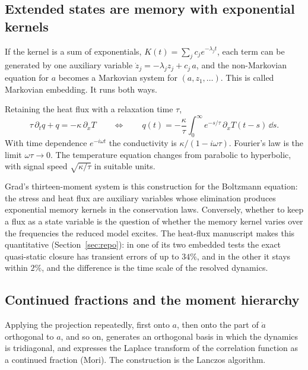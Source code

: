 \subsection{Extended states are memory with exponential kernels}
\label{sec:embedding}

If the kernel is a sum of exponentials, $K(t)=\sum_jc_je^{-\lambda_jt}$,
each term can be generated by one auxiliary variable
$\dot z_j=-\lambda_jz_j+c_j\,a$, and the non-Markovian equation for $a$
becomes a Markovian system for $(a,z_1,\dots)$. This is called Markovian
embedding. It runs both ways.

\begin{example}
\label{ex:cattaneo}
Retaining the heat flux with a relaxation time $\tau$,
\begin{equation}
  \tau\,\partial_tq+q=-\kappa\,\partial_xT
  \qquad\Longleftrightarrow\qquad
  q(t)=-\frac{\kappa}{\tau}\int_0^\infty e^{-s/\tau}\,\partial_xT(t-s)\,\dd s .
\end{equation}
With time dependence $e^{-i\omega t}$ the conductivity is
$\kappa/(1-i\omega\tau)$. Fourier's law is the limit $\omega\tau\to0$. The
temperature equation changes from parabolic to hyperbolic, with signal
speed $\sqrt{\kappa/\tau}$ in suitable units.
\end{example}

Grad's thirteen-moment system is this construction for the Boltzmann
equation: the stress and heat flux are auxiliary variables whose
elimination produces exponential memory kernels in the conservation laws.
Conversely, whether to keep a flux as a state variable is the question of
whether the memory kernel varies over the frequencies the reduced model
excites. The heat-flux manuscript makes this quantitative
(Section~\ref{sec:repo}): in one of its two embedded tests the exact
quasi-static closure has transient errors of up to $34\%$, and in the other
it stays within $2\%$, and the difference is the time scale of the resolved
dynamics.

\subsection{Continued fractions and the moment hierarchy}
\label{sec:cf}

Applying the projection repeatedly, first onto $a$, then onto the part of
$\dot a$ orthogonal to $a$, and so on, generates an orthogonal basis in
which the dynamics is tridiagonal, and expresses the Laplace transform of
the correlation function as a continued fraction (Mori). The construction
is the Lanczos algorithm.

